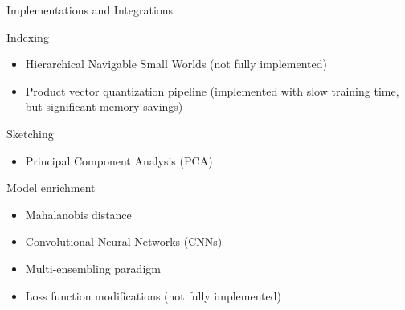 \documentclass[10pt, aspectratio=169]{beamer}
\begin{document}
\begin{frame}{Implementations and Integrations}

    \begin{block}{Indexing}
        \begin{itemize}
            \item Hierarchical Navigable Small Worlds\cite{hnsw} (not fully implemented)
            \item Product vector quantization pipeline\cite{pquantize} (implemented with slow training time, but significant memory savings)
        \end{itemize}
    \end{block}
    
    \begin{block}{Sketching}
        \begin{itemize}
            \item Principal Component Analysis\cite{pca-origin} (PCA)
        \end{itemize}
    \end{block}
    
    \begin{block}{Model enrichment}
        \begin{itemize}
        	\item Mahalanobis distance\cite{mahalanobis}
            \item Convolutional Neural Networks\cite{cnn} (CNNs)
            \item Multi-ensembling paradigm\cite{ensembling}
            \item Loss function modifications (not fully implemented)
        \end{itemize}
    \end{block}
    
\end{frame}
\end{document}
